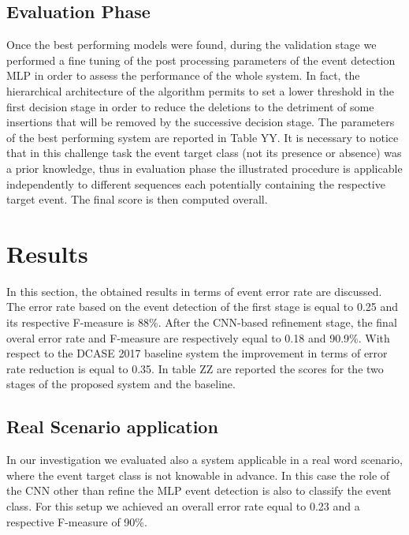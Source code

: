 \documentclass{article}
\begin{document}
\begin{sloppy}
\subsection{Evaluation Phase}
Once the best performing models were found, during the validation stage we performed a fine tuning of the post processing parameters of the event detection MLP in order to assess the performance of the whole system. In fact, the hierarchical architecture of the algorithm permits to set a lower threshold in the first decision stage in order to reduce the deletions to the detriment of some insertions that will be removed by the successive decision stage. The parameters of the best performing system are reported in Table YY. It is necessary to notice that in this challenge task the event target class (not its presence or absence) was a prior knowledge, thus in evaluation phase the illustrated procedure is applicable independently to different sequences each potentially containing the respective target event. The final score is then computed overall.
\section{Results}
\label{sec:results}
%
In this section, the obtained results in terms of event error rate are discussed. The error rate based on the event detection of the first stage is equal to 0.25 and its respective F-measure is 88\%. After the CNN-based refinement stage, the final overal error rate and F-measure are respectively equal to 0.18 and 90.9\%. With respect to the DCASE 2017 baseline system the improvement in terms of error rate reduction is equal to 0.35.  In table ZZ are reported the scores for the two stages of the proposed system and the baseline.

\subsection{Real Scenario application}
In our investigation we evaluated also a system applicable in a real word scenario, where the event target class is not knowable in advance. In this case the role of the CNN other than refine the MLP event detection is also to classify the event class. For this setup we achieved an overall error rate equal to 0.23 and a respective F-measure of 90\%.


\end{sloppy}
\end{document}
